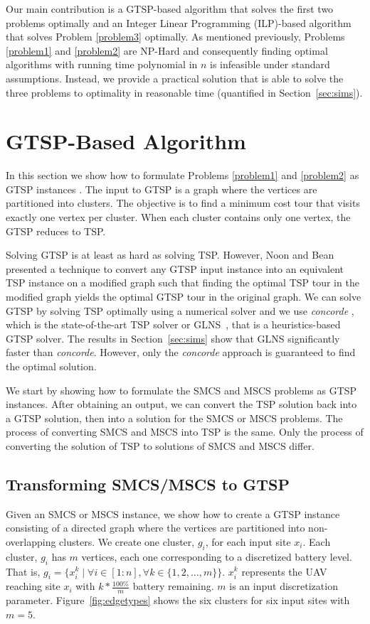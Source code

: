 \documentclass[letterpaper,10pt,conference]{ieeeconf}
\begin{document}
Our main contribution is a GTSP-based algorithm that solves the first two problems optimally and an Integer Linear Programming (ILP)-based algorithm that solves Problem \ref{problem3} optimally. As mentioned previously, Problems \ref{problem1} and \ref{problem2} are NP-Hard and consequently finding optimal algorithms with running time polynomial in $n$ is infeasible under standard assumptions. Instead, we provide a practical solution that is able to solve the three problems to optimality in reasonable time (quantified in Section~\ref{sec:sims}).

\section{GTSP-Based Algorithm}
In this section we show how to formulate Problems \ref{problem1} and \ref{problem2} as GTSP instances \cite{noon1993efficient}. The input to GTSP is a graph where the vertices are partitioned into clusters. The objective is to find a minimum cost tour that visits exactly one vertex per cluster. When each cluster contains only one vertex, the GTSP reduces to TSP. 

Solving GTSP is at least as hard as solving TSP. However, Noon and Bean \cite{noon1993efficient} presented a technique to convert any GTSP input instance into an equivalent TSP instance on a modified graph such that finding the optimal TSP tour in the modified graph yields the optimal GTSP tour in the original graph. We can solve GTSP by solving TSP optimally using a numerical solver and we use \emph{concorde} \cite{applegate2006concorde}, which is the state-of-the-art TSP solver or GLNS~\cite{Smith2016GLNS}, that is a heuristics-based GTSP solver. The results in Section~\ref{sec:sims} show that GLNS significantly faster than \emph{concorde}. However, only the \emph{concorde} approach is guaranteed to find the optimal solution.

We start by showing how to formulate the SMCS and MSCS problems as GTSP instances. After obtaining an output, we can convert the TSP solution back into a GTSP solution, then into a solution for the SMCS or MSCS problems. The process of converting SMCS and MSCS into TSP is the same. Only the process of converting the solution of TSP to solutions of SMCS and MSCS differ.

\subsection{Transforming SMCS/MSCS to GTSP}
Given an SMCS or MSCS instance, we show how to create a GTSP instance consisting of a directed graph where the vertices are partitioned into non-overlapping clusters. We create one cluster, $g_i$, for each input site $x_i$. Each cluster, $g_i$ has $m$ vertices, each one corresponding to a discretized battery level. That is, $g_i = \{x_i^k \mid \forall i\in [1:n], \forall k\in \{1, 2, \ldots, m\}\}$. $x_i^k$ represents the UAV reaching site $x_i$ with $k * \frac{100\%}{m}$ battery remaining. $m$ is an input discretization parameter. Figure~\ref{fig:edgetypes} shows the six clusters for six input sites with $m=5$.
\end{document}
